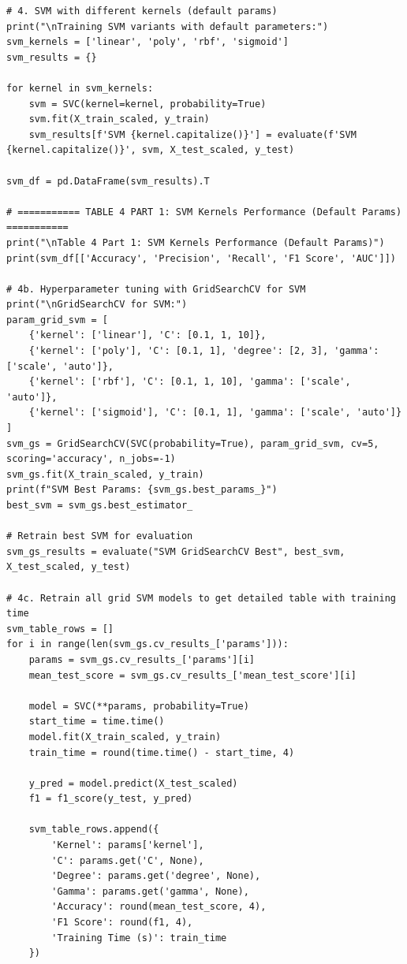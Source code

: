 \documentclass[12pt]{article}
\begin{document}
\begin{verbatim}
# 4. SVM with different kernels (default params)
print("\nTraining SVM variants with default parameters:")
svm_kernels = ['linear', 'poly', 'rbf', 'sigmoid']
svm_results = {}

for kernel in svm_kernels:
    svm = SVC(kernel=kernel, probability=True)
    svm.fit(X_train_scaled, y_train)
    svm_results[f'SVM {kernel.capitalize()}'] = evaluate(f'SVM {kernel.capitalize()}', svm, X_test_scaled, y_test)

svm_df = pd.DataFrame(svm_results).T

# =========== TABLE 4 PART 1: SVM Kernels Performance (Default Params) ===========
print("\nTable 4 Part 1: SVM Kernels Performance (Default Params)")
print(svm_df[['Accuracy', 'Precision', 'Recall', 'F1 Score', 'AUC']])

# 4b. Hyperparameter tuning with GridSearchCV for SVM
print("\nGridSearchCV for SVM:")
param_grid_svm = [
    {'kernel': ['linear'], 'C': [0.1, 1, 10]},
    {'kernel': ['poly'], 'C': [0.1, 1], 'degree': [2, 3], 'gamma': ['scale', 'auto']},
    {'kernel': ['rbf'], 'C': [0.1, 1, 10], 'gamma': ['scale', 'auto']},
    {'kernel': ['sigmoid'], 'C': [0.1, 1], 'gamma': ['scale', 'auto']}
]
svm_gs = GridSearchCV(SVC(probability=True), param_grid_svm, cv=5, scoring='accuracy', n_jobs=-1)
svm_gs.fit(X_train_scaled, y_train)
print(f"SVM Best Params: {svm_gs.best_params_}")
best_svm = svm_gs.best_estimator_

# Retrain best SVM for evaluation
svm_gs_results = evaluate("SVM GridSearchCV Best", best_svm, X_test_scaled, y_test)

# 4c. Retrain all grid SVM models to get detailed table with training time
svm_table_rows = []
for i in range(len(svm_gs.cv_results_['params'])):
    params = svm_gs.cv_results_['params'][i]
    mean_test_score = svm_gs.cv_results_['mean_test_score'][i]

    model = SVC(**params, probability=True)
    start_time = time.time()
    model.fit(X_train_scaled, y_train)
    train_time = round(time.time() - start_time, 4)

    y_pred = model.predict(X_test_scaled)
    f1 = f1_score(y_test, y_pred)

    svm_table_rows.append({
        'Kernel': params['kernel'],
        'C': params.get('C', None),
        'Degree': params.get('degree', None),
        'Gamma': params.get('gamma', None),
        'Accuracy': round(mean_test_score, 4),
        'F1 Score': round(f1, 4),
        'Training Time (s)': train_time
    })


\end{verbatim}
\end{document}
